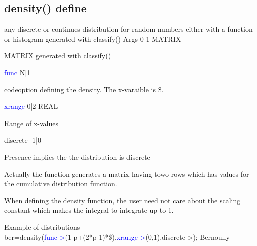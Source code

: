 \begin{itemize}
\subsection{\textcolor{VioletRed}{density}() define}
\label{density}
any discrete or continues distribution for random numbers either with a function
or histogram generated with \textcolor{VioletRed}{classify}()
\vspace{0.3cm}
\hline
\vspace{0.3cm}
\noindent Args \tabto{3cm} 0-1 \tabto{5cm}  MATRIX  \tabto{7cm}
\begin{changemargin}{3cm}{0cm}
\noindent  MATRIX generated with \textcolor{VioletRed}{classify}()
\end{changemargin}
\vspace{0.3cm}
\hline
\vspace{0.3cm}
\noindent \textcolor{blue}{func} \tabto{3cm}  N|1 \tabto{5cm}    \tabto{7cm}
\begin{changemargin}{3cm}{0cm}
\noindent codeoption defining the density. The x-varaible is \$.
\end{changemargin}
\vspace{0.3cm}
\hline
\vspace{0.3cm}
\noindent \textcolor{blue}{xrange} \tabto{3cm} 0|2 \tabto{5cm}   REAL \tabto{7cm}
\begin{changemargin}{3cm}{0cm}
\noindent  Range of x-values
\end{changemargin}
\vspace{0.3cm}
\hline
\vspace{0.3cm}
\noindent discrete \tabto{3cm} -1|0 \tabto{5cm}    \tabto{7cm}
\begin{changemargin}{3cm}{0cm}
\noindent  Presence implies the the distribution is discrete
\end {changemargin}
\hline
\vspace{0.2cm}
\begin{note}
Actually the function generates a matrix having towo rows which
has values for the cumulative distribution function.
\end{note}
\begin{note}
When defining the density function, the user need not care about
the scaling constant which makes the integral to integrate up to 1.
\end{note}
\begin{example}[densityex]Example of distributions\\
\label{densityex}
ber=\textcolor{VioletRed}{density}(\textcolor{blue}{func->}(1-p+(2*p-1)*\$),\textcolor{blue}{xrange->}(0,1),discrete->); Bernoully\\

\end{example}
\end{itemize}
